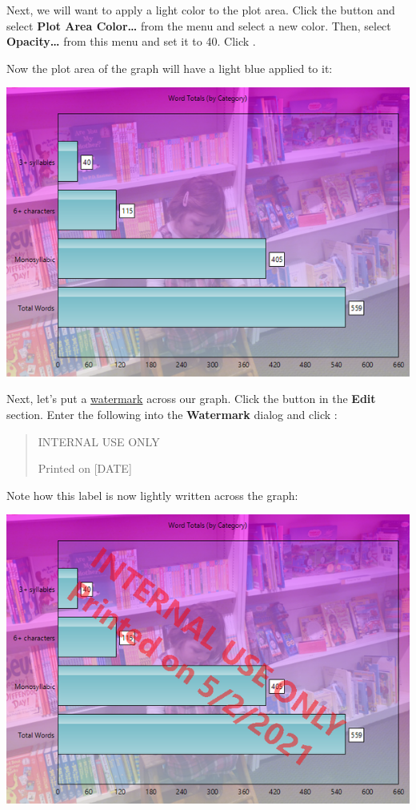 \documentclass[
]{book}
\theoremstyle{definition}
\theoremstyle{definition}
\theoremstyle{definition}
\theoremstyle{definition}
\theoremstyle{remark}
\begin{document}
Next, we will want to apply a light color to the plot area. Click the  button and select \textbf{Plot Area Color\ldots{}} from the menu and select a new color. Then, select \textbf{Opacity\ldots{}} from this menu and set it to 40. Click .

Now the plot area of the graph will have a light blue applied to it:

\includegraphics{Images/ExamplePlotBackgroundColorChanged.png}

Next, let's put a \protect\hyperlink{watermark-and-logo}{watermark} across our graph. Click the  button in the \textbf{Edit} section. Enter the following into the \textbf{Watermark} dialog and click :

\begin{quote}
INTERNAL USE ONLY

Printed on {[}DATE{]}
\end{quote}

Note how this label is now lightly written across the graph:

\includegraphics{Images/ExampleWatermarkChanged.png}
\end{document}
